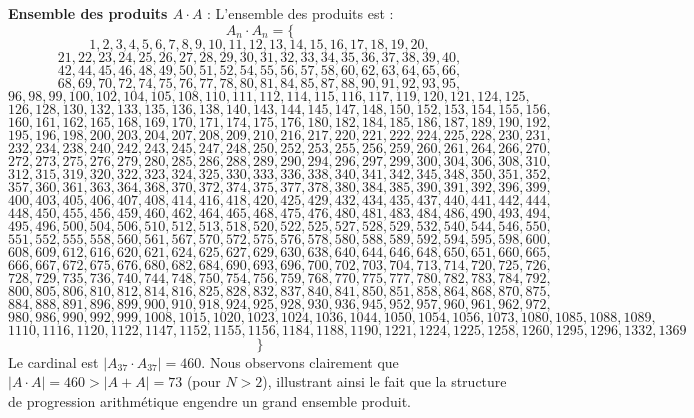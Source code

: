 \documentclass[11pt,a4paper]{article}
\begin{document}
\textbf{Ensemble des produits $A \cdot A$} :
L'ensemble des produits est :
$$ A_{{{n}}} \cdot A_{{{n}}} = \{ $$$$ 1, 2, 3, 4, 5, 6, 7, 8, 9, 10, 11, 12, 13, 14, 15, 16, 17, 18, 19, 20, $$$$ 21, 22, 23, 24, 25, 26, 27, 28, 29, 30, 31, 32, 33, 34, 35, 36, 37, 38, 39, 40, $$$$ 42, 44, 45, 46, 48, 49, 50, 51, 52, 54, 55, 56, 57, 58, 60, 62, 63, 64, 65, 66, $$$$ 68, 69, 70, 72, 74, 75, 76, 77, 78, 80, 81, 84, 85, 87, 88, 90, 91, 92, 93, 95, $$$$ 96, 98, 99, 100, 102, 104, 105, 108, 110, 111, 112, 114, 115, 116, 117, 119, 120, 121, 124, 125, $$$$ 126, 128, 130, 132, 133, 135, 136, 138, 140, 143, 144, 145, 147, 148, 150, 152, 153, 154, 155, 156, $$$$ 160, 161, 162, 165, 168, 169, 170, 171, 174, 175, 176, 180, 182, 184, 185, 186, 187, 189, 190, 192, $$$$ 195, 196, 198, 200, 203, 204, 207, 208, 209, 210, 216, 217, 220, 221, 222, 224, 225, 228, 230, 231, $$$$ 232, 234, 238, 240, 242, 243, 245, 247, 248, 250, 252, 253, 255, 256, 259, 260, 261, 264, 266, 270, $$$$ 272, 273, 275, 276, 279, 280, 285, 286, 288, 289, 290, 294, 296, 297, 299, 300, 304, 306, 308, 310, $$$$ 312, 315, 319, 320, 322, 323, 324, 325, 330, 333, 336, 338, 340, 341, 342, 345, 348, 350, 351, 352, $$$$ 357, 360, 361, 363, 364, 368, 370, 372, 374, 375, 377, 378, 380, 384, 385, 390, 391, 392, 396, 399, $$$$ 400, 403, 405, 406, 407, 408, 414, 416, 418, 420, 425, 429, 432, 434, 435, 437, 440, 441, 442, 444, $$$$ 448, 450, 455, 456, 459, 460, 462, 464, 465, 468, 475, 476, 480, 481, 483, 484, 486, 490, 493, 494, $$$$ 495, 496, 500, 504, 506, 510, 512, 513, 518, 520, 522, 525, 527, 528, 529, 532, 540, 544, 546, 550, $$$$ 551, 552, 555, 558, 560, 561, 567, 570, 572, 575, 576, 578, 580, 588, 589, 592, 594, 595, 598, 600, $$$$ 608, 609, 612, 616, 620, 621, 624, 625, 627, 629, 630, 638, 640, 644, 646, 648, 650, 651, 660, 665, $$$$ 666, 667, 672, 675, 676, 680, 682, 684, 690, 693, 696, 700, 702, 703, 704, 713, 714, 720, 725, 726, $$$$ 728, 729, 735, 736, 740, 744, 748, 750, 754, 756, 759, 768, 770, 775, 777, 780, 782, 783, 784, 792, $$$$ 800, 805, 806, 810, 812, 814, 816, 825, 828, 832, 837, 840, 841, 850, 851, 858, 864, 868, 870, 875, $$$$ 884, 888, 891, 896, 899, 900, 910, 918, 924, 925, 928, 930, 936, 945, 952, 957, 960, 961, 962, 972, $$$$ 980, 986, 990, 992, 999, 1008, 1015, 1020, 1023, 1024, 1036, 1044, 1050, 1054, 1056, 1073, 1080, 1085, 1088, 1089, $$$$ 1110, 1116, 1120, 1122, 1147, 1152, 1155, 1156, 1184, 1188, 1190, 1221, 1224, 1225, 1258, 1260, 1295, 1296, 1332, 1369 $$$$ \} $$
Le cardinal est $|A_{37} \cdot A_{37}| = 460$.
Nous observons clairement que $|A \cdot A| = 460 > |A+A| = 73$ (pour $N > 2$), illustrant ainsi le fait que la structure de progression arithmétique engendre un grand ensemble produit.
\newpage
\end{document}
